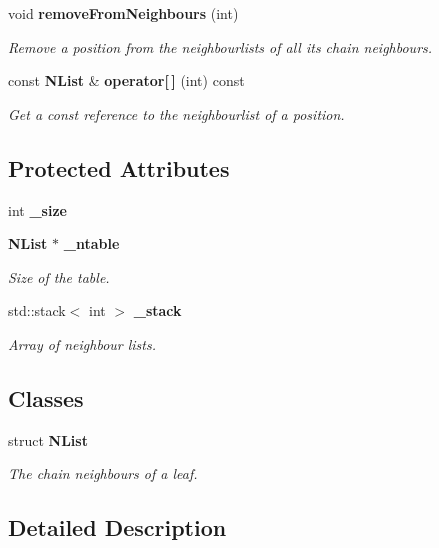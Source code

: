 \begin{CompactItemize}
void {\bf remove\-From\-Neighbours} (int)
\begin{CompactList}\small\item\em Remove a position from the neighbourlists of all its chain neighbours. \item\end{CompactList}\item 
const {\bf NList} \& {\bf operator[$\,$]} (int) const 
\begin{CompactList}\small\item\em Get a const reference to the neighbourlist of a position. \item\end{CompactList}\end{CompactItemize}
\subsection*{Protected Attributes}
\begin{CompactItemize}
\item 
int {\bf \_\-size}
\item 
{\bf NList} $\ast$ {\bf \_\-ntable}
\begin{CompactList}\small\item\em Size of the table. \item\end{CompactList}\item 
std::stack$<$ int $>$ {\bf \_\-stack}
\begin{CompactList}\small\item\em Array of neighbour lists. \item\end{CompactList}\end{CompactItemize}
\subsection*{Classes}
\begin{CompactItemize}
\item 
struct {\bf NList}
\begin{CompactList}\small\item\em The chain neighbours of a leaf. \item\end{CompactList}\end{CompactItemize}


\subsection{Detailed Description}
